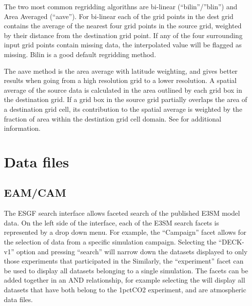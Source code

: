 \documentclass[letterpaper,10pt,english]{sphinxmanual}
\begin{document}
The two most common regridding algorithns are bi-linear (“bilin”/”blin”) and Area Averaged (“aave”). For bi-linear each of the grid points in the dest grid contains the
average of the nearest four grid points in the source grid, weighted by their distance from the destination grid point.
If any of the four surrounding input grid points contain missing data, the interpolated value will be flagged as missing. Bilin is a good default regridding method.

The aave method is the area average with latitude weighting, and gives better results when going from a high resolution grid to a lower resolution.
A spatial average of the source data is calculated in the area outlined by each grid box in the destination grid.
If a grid box in the source grid partially overlaps the area of a destination grid cell, its contribution to the spatial average is weighted by the fraction of area within the destintion grid cell domain.
See  for additional information.


\section{Data files}
\label{\detokenize{guide:data-files}}

\subsection{EAM/CAM}
\label{\detokenize{guide:eam-cam}}
 The ESGF search interface allows faceted search of the published E3SM model data.
On the left side of the interface, each of the E3SM search facets is represented by a drop down menu. For example, the “Campaign” facet allows for the selection of data from a specific
simulation campaign. Selecting the “DECK-v1” option and pressing “search” will narrow down the datasets displayed to only those experiments that participated in the 
Similarly, the “experiment” facet can be used to display all datasets belonging to a single simulation. The facets can be added together in an AND relationship, for example selecting the 
will display all datasets that have both belong to the 1pctCO2 experiment, and are atmospheric data files.
\end{document}
